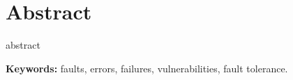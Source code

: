 \section{Abstract}

abstract

\textbf{Keywords:} faults, errors, failures, vulnerabilities, fault tolerance.